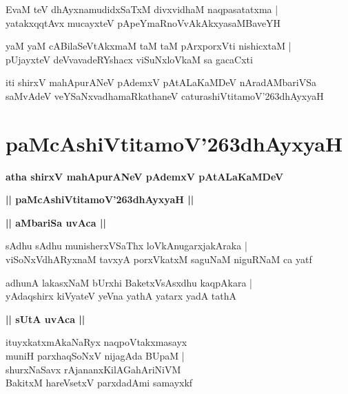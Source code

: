 \documentclass[twoside,12pt,openright]{book}
\def\S{\char'263}
\newcounter{shloka}[chapter]
\def\uvaca#1{\centerline{{\large\textbf{#1}}}}
\begin{document}
\begin{shloka}%
EvaM teV dhAyxnamudidxSaTxM divxvidhaM naqpasatatxma |\\
yatakxqqtAvx mucayxteV pApeYmaRnoVvAkAkxyasaMBaveYH 
\end{shloka}

\begin{shloka}%
yaM yaM cABilaSeVtAkxmaM taM taM pArxporxVti nishicxtaM |\\
pUjayxteV deVvavadeRYshacx viSuNxloVkaM sa gacaCxti 
\end{shloka}

\begin{center}
iti shirxV mahApurANeV pAdemxV pAtALaKaMDeV  nAradAMbariVSa saMvAdeV veYSaNxvadhamaRkathaneV 
caturashiVtitamoV\S dhAyxyaH
\end{center}

\chapter{paMcAshiVtitamoV\S dhAyxyaH}

\begin{center}
{\LARGE\bfseries atha shirxV mahApurANeV pAdemxV pAtALaKaMDeV }
\end{center}

\begin{center}         
{\LARGE\bfseries || paMcAshiVtitamoV\S dhAyxyaH ||}
\end{center}

\uvaca{|| aMbariSa uvAca ||}

\begin{shloka}%
sAdhu sAdhu munisherxVSaThx loVkAnugarxjakAraka |\\
viSoNxVdhARyxnaM tavxyA porxVkatxM saguNaM niguRNaM ca yatf 
\end{shloka}

\begin{shloka}%
adhunA lakasxNaM bUrxhi BaketxVsAsxdhu kaqpAkara |\\
yAdaqshirx kiVyateV yeVna yathA yatarx yadA tathA 
\end{shloka}

\uvaca{|| sUtA uvAca ||}

\begin{shloka}%
ituyxkatxmAkaNaRyx naqpoVtakxmasayx \\
muniH parxhaqSoNxV nijagAda BUpaM |\\
shurxNaSavx rAjananxKilAGahAriNiVM \\
BakitxM hareVsetxV parxdadAmi samayxkf 
\end{shloka}
\end{document}
